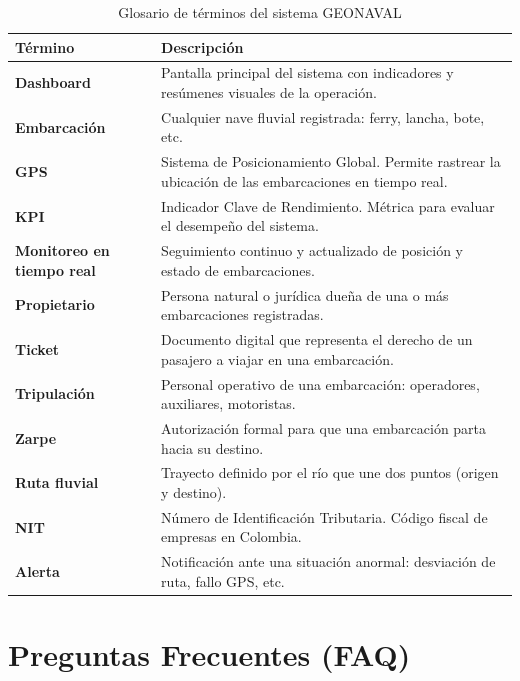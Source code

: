 \documentclass[12pt,a4paper]{report}
\begin{document}
\begin{table}[H]
  \centering
  \renewcommand{\arraystretch}{1.5}
  \begin{tabularx}{\textwidth}{@{}L{4.5cm} X@{}}
    \toprule
    \textbf{Término} & \textbf{Descripción} \\
    \midrule
    \textbf{Dashboard} & Pantalla principal del sistema con indicadores y resúmenes visuales de la operación. \\
    \textbf{Embarcación} & Cualquier nave fluvial registrada: ferry, lancha, bote, etc. \\
    \textbf{GPS} & Sistema de Posicionamiento Global. Permite rastrear la ubicación de las embarcaciones en tiempo real. \\
    \textbf{KPI} & Indicador Clave de Rendimiento. Métrica para evaluar el desempeño del sistema. \\
    \textbf{Monitoreo en tiempo real} & Seguimiento continuo y actualizado de posición y estado de embarcaciones. \\
    \textbf{Propietario} & Persona natural o jurídica dueña de una o más embarcaciones registradas. \\
    \textbf{Ticket} & Documento digital que representa el derecho de un pasajero a viajar en una embarcación. \\
    \textbf{Tripulación} & Personal operativo de una embarcación: operadores, auxiliares, motoristas. \\
    \textbf{Zarpe} & Autorización formal para que una embarcación parta hacia su destino. \\
    \textbf{Ruta fluvial} & Trayecto definido por el río que une dos puntos (origen y destino). \\
    \textbf{NIT} & Número de Identificación Tributaria. Código fiscal de empresas en Colombia. \\
    \textbf{Alerta} & Notificación ante una situación anormal: desviación de ruta, fallo GPS, etc. \\
    \bottomrule
  \end{tabularx}
  \caption{Glosario de términos del sistema GEONAVAL}
\end{table}

\chapter{Preguntas Frecuentes (FAQ)}
\end{document}
